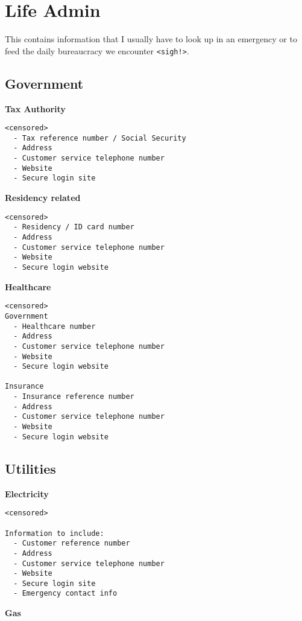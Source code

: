 \documentclass[]{book}
\theoremstyle{definition}
\theoremstyle{definition}
\theoremstyle{definition}
\theoremstyle{remark}
\begin{document}
\chapter{Life Admin}\label{life-admin}

This contains information that I usually have to look up in an emergency
or to feed the daily bureaucracy we encounter
\texttt{\textless{}sigh!\textgreater{}}.

\section{Government}\label{government}

\textbf{Tax Authority}

\begin{verbatim}
<censored>
  - Tax reference number / Social Security
  - Address
  - Customer service telephone number
  - Website
  - Secure login site
\end{verbatim}

\textbf{Residency related}

\begin{verbatim}
<censored>
  - Residency / ID card number
  - Address
  - Customer service telephone number
  - Website
  - Secure login website
\end{verbatim}

\textbf{Healthcare}

\begin{verbatim}
<censored>
Government
  - Healthcare number
  - Address
  - Customer service telephone number
  - Website
  - Secure login website
  
Insurance
  - Insurance reference number
  - Address
  - Customer service telephone number
  - Website
  - Secure login website
\end{verbatim}

\section{Utilities}\label{utilities}

\textbf{Electricity}

\begin{verbatim}
<censored>

Information to include:
  - Customer reference number
  - Address
  - Customer service telephone number
  - Website
  - Secure login site
  - Emergency contact info
\end{verbatim}

\textbf{Gas}
\end{document}

